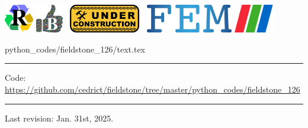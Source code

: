 \noindent
\includegraphics[height=1.25cm]{images/pictograms/replication}
\includegraphics[height=1.25cm]{images/pictograms/benchmark}
\includegraphics[height=1.25cm]{images/pictograms/under_construction}
\includegraphics[height=1.25cm]{images/pictograms/FEM}
\includegraphics[height=1.25cm]{images/pictograms/paraview}


\begin{flushright} {\tiny {\color{gray} python\_codes/fieldstone\_126/text.tex}} \end{flushright}

%

\par\noindent\rule{\textwidth}{0.4pt}

\begin{center}
\inpython
{\small Code: \url{https://github.com/cedrict/fieldstone/tree/master/python_codes/fieldstone_126}}
\end{center}



\par\noindent\rule{\textwidth}{0.4pt}

Last revision: Jan. 31st, 2025.

